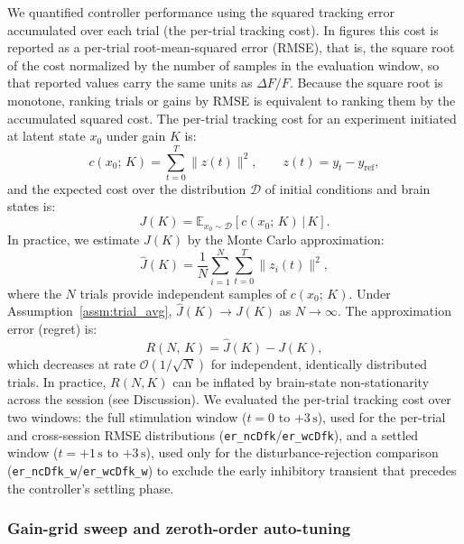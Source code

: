We quantified controller performance using the squared tracking error
accumulated over each trial (the per-trial tracking cost). In figures this
cost is reported as a per-trial root-mean-squared error (RMSE), that is, the
square root of the cost normalized by the number of samples in the evaluation
window, so that reported values carry the same units as $\Delta F/F$. Because
the square root is monotone, ranking trials or gains by RMSE is equivalent to
ranking them by the accumulated squared cost. The per-trial tracking cost for
an experiment initiated at latent state $x_{0}$ under gain $K$ is:
%
\begin{equation}
    c(x_{0};\,K) = \sum_{t=0}^{T} \|z(t)\|^{2},
    \qquad z(t) = y_{t} - y_{\mathrm{ref}},
    \label{eq:trial_cost}
\end{equation}
%
and the expected cost over the distribution $\mathcal{D}$ of initial
conditions and brain states is:
%
\begin{equation}
    J(K) = \mathbb{E}_{x_{0} \sim \mathcal{D}}\!
           \left[c(x_{0};\,K)\,|\,K\right].
    \label{eq:expected_cost}
\end{equation}
%
In practice, we estimate $J(K)$ by the Monte Carlo approximation:
%
\begin{equation}
    \hat{J}(K) = \frac{1}{N}\sum_{i=1}^{N}\sum_{t=0}^{T}
                 \|z_{i}(t)\|^{2},
    \label{eq:emp_cost}
\end{equation}
%
where the $N$ trials provide independent samples of $c(x_{0};\,K)$.
Under Assumption~\ref{assm:trial_avg}, $\hat{J}(K) \to J(K)$ as $N \to
\infty$. The approximation error (regret) is:
%
\begin{equation}
    R(N,\,K) = \hat{J}(K) - J(K),
    \label{eq:regret}
\end{equation}
%
which decreases at rate $\mathcal{O}(1/\sqrt{N})$ for independent,
identically distributed trials. In practice, $R(N,K)$ can be inflated
by brain-state non-stationarity across the session (see Discussion).
We evaluated the per-trial tracking cost over two windows: the full
stimulation window ($t = 0$ to $+3\,\text{s}$), used for the per-trial and
cross-session RMSE distributions (\texttt{er\_ncDfk}/\texttt{er\_wcDfk}), and a
settled window ($t = +1\,\text{s}$ to $+3\,\text{s}$), used only for the
disturbance-rejection comparison (\texttt{er\_ncDfk\_w}/\texttt{er\_wcDfk\_w})
to exclude the early inhibitory transient that precedes the controller's
settling phase.

\subsubsection*{Gain-grid sweep and zeroth-order auto-tuning}

